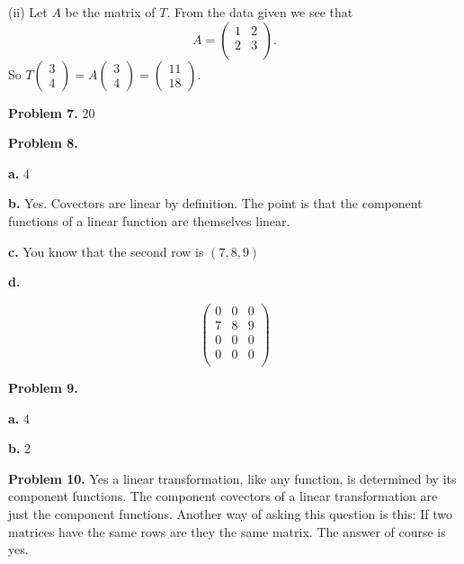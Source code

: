 \documentclass[oneside,12pt]{amsart}
\begin{document}
\medskip

(ii) Let $A$ be the matrix of $T$. From the data given we see that
$$A = \begin{pmatrix}
1 & 2 \\
2 & 3 \\
\end{pmatrix}
.$$
So $T\begin{pmatrix} 3 \\ 4\end{pmatrix} = A\begin{pmatrix} 3 \\ 4\end{pmatrix} = \begin{pmatrix} 11 \\ 18\end{pmatrix}$.

\medskip

\textbf{Problem 7.} 20

\medskip

\textbf{Problem 8.}

\textbf{a.} 4

\smallskip

\textbf{b.} Yes. Covectors are linear by definition. The point is that the component functions
of a linear function are themselves linear.

\smallskip

\textbf{c.} You know that the second row is $(7,8,9)$

\smallskip


\textbf{d.}

$$
\begin{pmatrix}
0 & 0 & 0 \\
7 & 8 & 9 \\
0 & 0 & 0 \\
0 & 0 & 0 \\
\end{pmatrix}
$$

\medskip

\textbf{Problem 9.}

\textbf{a.} 4

\smallskip

\textbf{b.} 2

\medskip

\textbf{Problem 10.} Yes a linear transformation, like any function, is
determined by its component functions. The component covectors of a
linear transformation are just the component functions. Another way of
asking this question is this: If two matrices have the same rows are
they the same matrix. The answer of course is yes.
\end{document}
